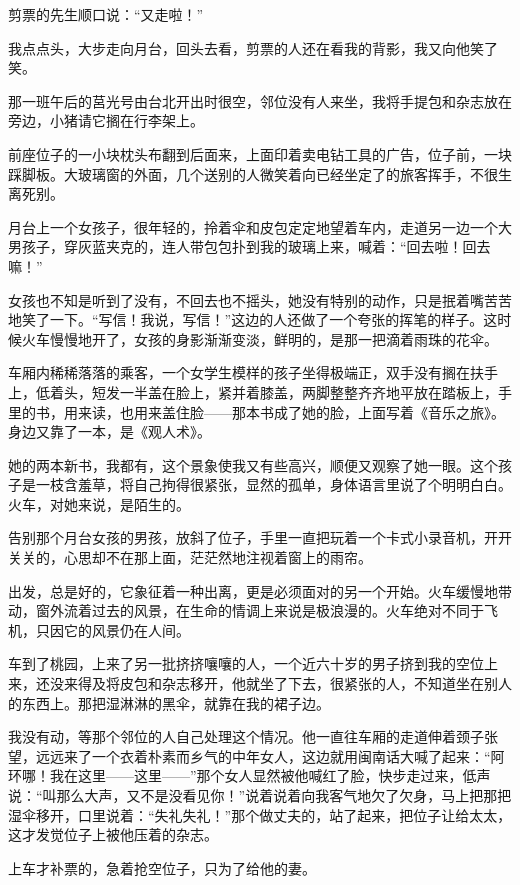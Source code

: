 \par 剪票的先生顺口说：“又走啦！”
\par 我点点头，大步走向月台，回头去看，剪票的人还在看我的背影，我又向他笑了笑。
\par 那一班午后的莒光号由台北开出时很空，邻位没有人来坐，我将手提包和杂志放在旁边，小猪请它搁在行李架上。
\par 前座位子的一小块枕头布翻到后面来，上面印着卖电钻工具的广告，位子前，一块踩脚板。大玻璃窗的外面，几个送别的人微笑着向已经坐定了的旅客挥手，不很生离死别。
\par 月台上一个女孩子，很年轻的，拎着伞和皮包定定地望着车内，走道另一边一个大男孩子，穿灰蓝夹克的，连人带包包扑到我的玻璃上来，喊着：“回去啦！回去嘛！”
\par 女孩也不知是听到了没有，不回去也不摇头，她没有特别的动作，只是抿着嘴苦苦地笑了一下。“写信！我说，写信！”这边的人还做了一个夸张的挥笔的样子。这时候火车慢慢地开了，女孩的身影渐渐变淡，鲜明的，是那一把滴着雨珠的花伞。
\par 车厢内稀稀落落的乘客，一个女学生模样的孩子坐得极端正，双手没有搁在扶手上，低着头，短发一半盖在脸上，紧并着膝盖，两脚整整齐齐地平放在踏板上，手里的书，用来读，也用来盖住脸——那本书成了她的脸，上面写着《音乐之旅》。身边又靠了一本，是《观人术》。
\par 她的两本新书，我都有，这个景象使我又有些高兴，顺便又观察了她一眼。这个孩子是一枝含羞草，将自己拘得很紧张，显然的孤单，身体语言里说了个明明白白。火车，对她来说，是陌生的。
\par 告别那个月台女孩的男孩，放斜了位子，手里一直把玩着一个卡式小录音机，开开关关的，心思却不在那上面，茫茫然地注视着窗上的雨帘。
\par 出发，总是好的，它象征着一种出离，更是必须面对的另一个开始。火车缓慢地带动，窗外流着过去的风景，在生命的情调上来说是极浪漫的。火车绝对不同于飞机，只因它的风景仍在人间。
\par 车到了桃园，上来了另一批挤挤嚷嚷的人，一个近六十岁的男子挤到我的空位上来，还没来得及将皮包和杂志移开，他就坐了下去，很紧张的人，不知道坐在别人的东西上。那把湿淋淋的黑伞，就靠在我的裙子边。
\par 我没有动，等那个邻位的人自己处理这个情况。他一直往车厢的走道伸着颈子张望，远远来了一个衣着朴素而乡气的中年女人，这边就用闽南话大喊了起来：“阿环哪！我在这里——这里——”那个女人显然被他喊红了脸，快步走过来，低声说：“叫那么大声，又不是没看见你！”说着说着向我客气地欠了欠身，马上把那把湿伞移开，口里说着：“失礼失礼！”那个做丈夫的，站了起来，把位子让给太太，这才发觉位子上被他压着的杂志。
\par 上车才补票的，急着抢空位子，只为了给他的妻。
